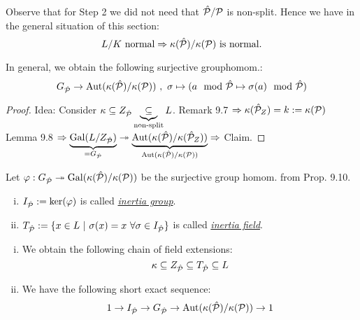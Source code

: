 \begin{Bem}
Observe that for Step 2 we did not need that $\hat{\mathcal{P}}/\mathcal{P}$ is non-split. Hence we have in the general situation of this section:
\[ L/K \text{ normal} \Rightarrow \kappa(\hat{\mathcal{P}}) / \kappa(\mathcal{P}) \text{ is normal}.\]
\end{Bem}

\begin{Prop}
In general, we obtain the following surjective grouphomom.:
\[G_{\hat{\mathcal{P}}} \to \operatorname{Aut}(\kappa(\hat{\mathcal{P}})/\kappa(\mathcal{P})) \ , \  \sigma \mapsto (a \mod {\hat{\mathcal{P}}} \mapsto \sigma(a) \mod {\hat{\mathcal{P}}})\]
\end{Prop}

\begin{proof}
Idea: Consider $\kappa \subseteq Z_{\hat{\mathcal{P}}} \underbrace{\subseteq}_{\text{non-split}} L$. Remark 9.7 $\Rightarrow \kappa(\hat{\mathcal{P}}_Z) =k:=\kappa(\mathcal{P})$\\
Lemma 9.8 $\Rightarrow \underbrace{\operatorname{Gal}(L/Z_{\hat{\mathcal{P}}})}_{=G_{\hat{\mathcal{P}}}} \twoheadrightarrow \underbrace{\operatorname{Aut}(\kappa(\hat{\mathcal{P}})/\kappa(\hat{\mathcal{P}}_Z))}_{\operatorname{Aut}(\kappa(\hat{\mathcal{P}})/\kappa(\mathcal{P}))} \Rightarrow$ Claim.
\end{proof}

\begin{defi}
Let $\varphi: G_{\hat{\mathcal{P}}} \twoheadrightarrow \operatorname{Gal}(\kappa(\hat{\mathcal{P}})/\kappa(\mathcal{P}))$ be the surjective group homom. from Prop. 9.10.
\begin{enumerate}[i)]
\item $I_{\hat{\mathcal{P}}}:=\ker(\varphi)$ is called \emph{\underline{inertia group}}.
\item $T_{\hP}:=\{x \in L \ | \ \sigma(x)=x \ \forall \sigma \in I_{\hP}\}$ is called \emph{\underline{inertia field}}.
\end{enumerate}
\end{defi}

\begin{Bem}
\begin{enumerate}[i)]
\item We obtain the following chain of field extensions:
\[ \kappa \subseteq Z_{\hat{\mathcal{P}}} \subseteq T_{\hat{\mathcal{P}}} \subseteq L\]
\item We have the following short exact sequence:
\[ 1 \to I_{\hat{\mathcal{P}}} \to G_{\hat{\mathcal{P}}} \to \operatorname{Aut}(\kappa(\hat{\mathcal{P}})/\kappa(\mathcal{P})) \to 1\]
\end{enumerate}
\end{Bem}

